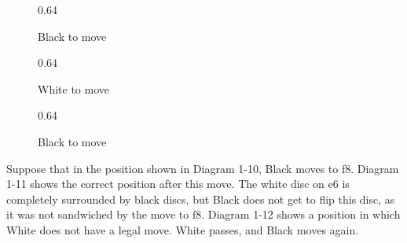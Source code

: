 \documentclass[a4paper,12pt]{book}
\newcommand{\scalefactorthreeup}{0.64}
\begin{document}
\begin{figure}[h]
\begin{center}
\begin{minipage}[t]{.32\textwidth}
\begin{othelloboard}{\scalefactorthreeup}
\dotmarkings
{}
\end{othelloboard}
\caption{Black to move}
\end{minipage}
\hfill
\begin{minipage}[t]{.32\textwidth}
\begin{othelloboard}{\scalefactorthreeup}
\end{othelloboard}
\caption{White to move}
\end{minipage}
\hfill
\begin{minipage}[t]{.32\textwidth}
\begin{othelloboard}{\scalefactorthreeup}
\end{othelloboard}
\caption{Black to move}
\end{minipage}
\end{center}
\end{figure}

Suppose that in the position shown in Diagram 1-10, Black moves to f8. Diagram
1-11 shows the correct position after this move. The white disc on e6 is completely
surrounded by black discs, but Black does not get to flip this disc, as it was not
sandwiched by the move to f8. Diagram 1-12 shows a position in which White does
not have a legal move. White passes, and Black moves again.
\end{document}
